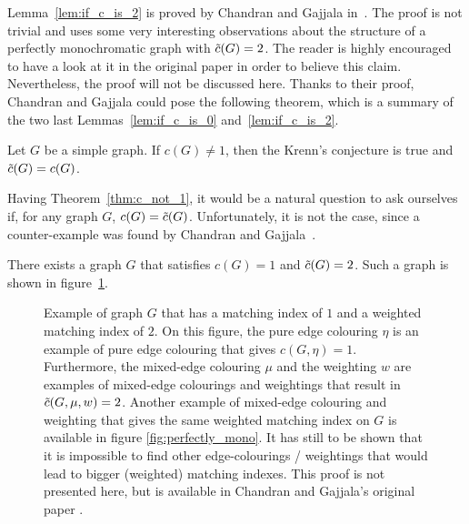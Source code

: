 Lemma~\ref{lem:if_c_is_2} is proved by Chandran and Gajjala in~\cite{chandran}.
The proof is not trivial and uses some very interesting observations about the structure of a perfectly monochromatic graph with $\Tilde{c}(G) = 2$.
The reader is highly encouraged to have a look at it in the original paper in order to believe this claim.
Nevertheless, the proof will not be discussed here.
Thanks to their proof, Chandran and Gajjala could pose the following theorem, which is a summary of the two last Lemmas~\ref{lem:if_c_is_0} and~\ref{lem:if_c_is_2}.

\begin{theorem}
    \label{thm:c_not_1}
    Let $G$ be a simple graph.
    If $c(G) \neq 1$, then the Krenn's conjecture is true and $\Tilde{c}(G) = c(G)$.
\end{theorem}

Having Theorem~\ref{thm:c_not_1}, it would be a natural question to ask ourselves if, for any graph $G$, $c(G) = \Tilde{c}(G)$.
Unfortunately, it is not the case, since a counter-example was found by Chandran and Gajjala~\cite{chandran}.

\begin{observation}
    \label{obs:c_not_c_tilde}
    There exists a graph $G$ that satisfies $c(G) = 1$ and $\Tilde{c}(G) = 2$.
    Such a graph is shown in figure~\ref{fig:proof_c_not_c_tilde}.
\end{observation}

\begin{figure}[H]
    \caption{Example of graph $G$ that has a matching index of $1$ and a weighted matching index of $2$.
        On this figure, the pure edge colouring $\eta$ is an example of pure edge colouring that gives $c(G, \eta) = 1$.
        Furthermore, the mixed-edge colouring $\mu$ and the weighting $w$ are examples of mixed-edge colourings and weightings that result in $\Tilde{c}(G, \mu, w) = 2$.
        Another example of mixed-edge colouring and weighting that gives the same weighted matching index on $G$ is available in figure \ref{fig:perfectly_mono}.
        It has still to be shown that it is impossible to find other edge-colourings / weightings that would lead to bigger (weighted) matching indexes.
        This proof is not presented here, but is available in Chandran and Gajjala's original paper \cite{chandran}.}
    \label{fig:proof_c_not_c_tilde}
\end{figure}


